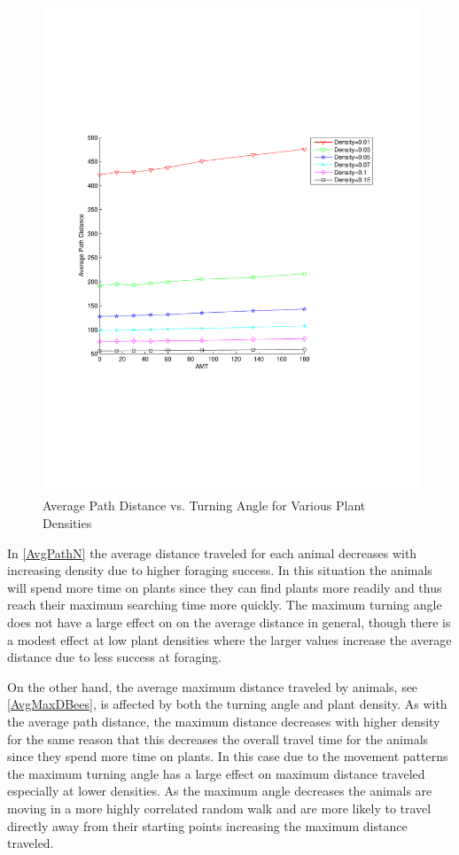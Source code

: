 \begin{figure}
  \begin{center}
  \includegraphics[scale=0.5, trim=0 240 50 300]{PathVsAMT.pdf}
  \end{center}
  \caption{\small Average Path Distance vs. Turning Angle for Various Plant Densities}
  \label{AvgPathN}
\end{figure}

In \autoref{AvgPathN} the average distance traveled for each animal decreases with increasing
density due to higher foraging success.  In this situation the animals will spend more time on
plants since they can find plants more readily and thus reach their maximum searching time more quickly.  The maximum turning angle does not have a large
effect on on the  average distance in general, though there is a modest effect at low plant densities
where the larger values increase the average distance due to less success at foraging.

On the other hand, the average maximum distance traveled by animals, see \autoref{AvgMaxDBees}, is affected by both
the turning angle and plant density. As with the average path distance, the maximum distance
decreases with higher density for the same reason that this decreases the overall travel time for the
animals since they spend more time on plants.  In
this case due to the movement patterns the maximum turning angle has a large effect on maximum distance traveled especially
at lower densities.  As the maximum angle decreases the animals are moving in a more highly correlated random walk and are more likely to travel directly
away from their starting points increasing the maximum distance traveled.

